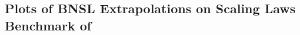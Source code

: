 \documentclass{article} %
\begin{document}
\clearpage
\subsection{Plots of BNSL Extrapolations on Scaling Laws Benchmark of \cite{Alabdulmohsi2022revisiting}}
\label{section:Plots_of_BNSL_Extrapolations}

\vspace{25.0mm}
\end{document}
